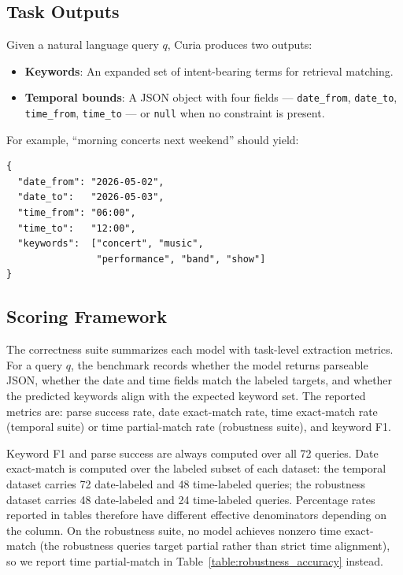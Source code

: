 \documentclass[conference]{IEEEtran}
\begin{document}
\subsection{Task Outputs}

Given a natural language query $q$, Curia produces two outputs:
\begin{itemize}
    \item \textbf{Keywords}: An expanded set of intent-bearing terms for retrieval matching.
    \item \textbf{Temporal bounds}: A JSON object with four fields --- \texttt{date\_from}, \texttt{date\_to}, \texttt{time\_from}, \texttt{time\_to} --- or \texttt{null} when no constraint is present.
\end{itemize}

For example, ``morning concerts next weekend'' should yield:
\begin{lstlisting}[language={}]
{
  "date_from": "2026-05-02",
  "date_to":   "2026-05-03",
  "time_from": "06:00",
  "time_to":   "12:00",
  "keywords":  ["concert", "music",
                "performance", "band", "show"]
}
\end{lstlisting}

\subsection{Scoring Framework}

The correctness suite summarizes each model with task-level extraction metrics. For a query $q$, the benchmark records whether the model returns parseable JSON, whether the date and time fields match the labeled targets, and whether the predicted keywords align with the expected keyword set. The reported metrics are: parse success rate, date exact-match rate, time exact-match rate (temporal suite) or time partial-match rate (robustness suite), and keyword F1.

Keyword F1 and parse success are always computed over all 72 queries. Date exact-match is computed over the labeled subset of each dataset: the temporal dataset carries 72 date-labeled and 48 time-labeled queries; the robustness dataset carries 48 date-labeled and 24 time-labeled queries. Percentage rates reported in tables therefore have different effective denominators depending on the column. On the robustness suite, no model achieves nonzero time exact-match (the robustness queries target partial rather than strict time alignment), so we report time partial-match in Table~\ref{table:robustness_accuracy} instead.
\end{document}
